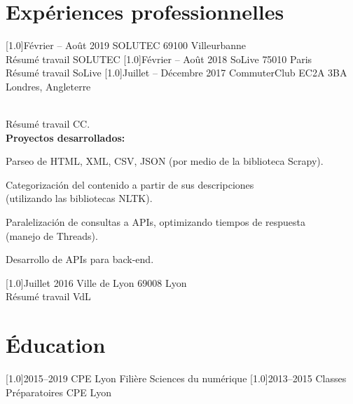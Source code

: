 \documentclass[french]{cv-style}     %
\begin{document}
\vspace{0.2cm}
\section{Expériences professionnelles}
\begin{entrylist}
\entry
  {\scalebox{.8}[1.0]{Février -- Août 2019}}
  {SOLUTEC}
  {69100 Villeurbanne}
  {\\
  Résumé travail SOLUTEC}
\entry
  {\scalebox{.8}[1.0]{Février -- Août 2018}}
  {SoLive}
  {75010 Paris}
  {\\
  Résumé travail SoLive}
\entry
  {\scalebox{.8}[1.0]{Juillet -- Décembre 2017      }}
  {CommuterClub}
  {EC2A 3BA Londres, Angleterre}
  {\\
  Résumé travail CC.\\
  \textbf{Proyectos desarrollados:}
  \begin{itemize}\small{
    \item Parseo de HTML, XML, CSV, JSON (por medio de la biblioteca Scrapy).
    \item Categorización del contenido a partir de sus descripciones\\
    (utilizando las bibliotecas NLTK).
    \item Paralelización de consultas a APIs, optimizando tiempos de respuesta\\
    (manejo de Threads).
    \item Desarrollo de APIs para back-end.}
  \end{itemize}}
\entry
  {\scalebox{.8}[1.0]{Juillet 2016}}
  {Ville de Lyon}
  {69008 Lyon}
  {\\
  Résumé travail VdL}
 
\end{entrylist}
\section{Éducation}
  \vspace{-0.2cm}
\begin{entrylist}
\entry
{\scalebox{.8}[1.0]{2015--2019}}
{CPE Lyon}
{Filière Sciences du numérique}
\entry
{\scalebox{.8}[1.0]{2013--2015}}
{Classes Préparatoires CPE Lyon}

\end{entrylist}
\end{document}
